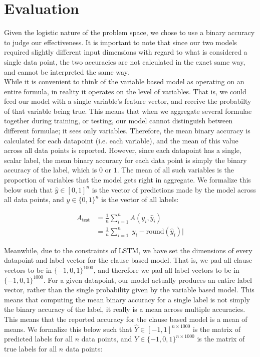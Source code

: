\documentclass{article}
\begin{document}
\section*{Evaluation}
Given the logistic nature of the problem space, we chose to use a binary accuracy to judge our effectiveness. It is
important to note that since our two models required slightly different input dimensions with regard to what is considered
a single data point, the two accuracies are not calculated in the exact same way, and cannot be interpreted the same way.\\

\noindent
While it is convenient to think of the variable based model as operating on an entire formula, in reality it operates on
the level of variables. That is, we could feed our model with a single variable's feature vector, and receive the
probabilty of that variable being true. This means that when we aggregate several formulae together during training,
or testing, our model cannot distinguish between different formulae; it sees only variables. Therefore, the mean binary
accuracy is calculated for each datapoint (i.e. each variable), and the mean of this value across all data points is
reported. However, since each datapoint has a single, scalar label, the mean binary accuracy for each data point is
simply the binary accuracy of the label, which is $0$ or $1$. The mean of all such variables is the proportion of
variables that the model gets right in aggregate. We formalize this below such that $\hat y \in [0, 1]^n$ is the vector of
predictions made by the model across all data points, and $y \in \{0, 1\}^n$ is the vector of all labels:

\[
    \begin{split}
        A_\text{test} &= \frac{1}{n} \sum_{i = 1}^n A(y_i, \hat y_i) \\
        &=  \frac{1}{n} \sum_{i = 1}^n \lvert y_i - \text{round}(\hat y_i)\rvert
    \end{split}
\]

\noindent
Meanwhile, due to the constraints of LSTM, we have set the dimensions of every datapoint and label vector for
the clause based model. That is, we pad all clause vectors to be in $\{-1, 0, 1\}^{1000}$, and therefore we pad all
label vectors to be in $\{-1, 0, 1\}^{1000}$. For a given datapoint, our model actually produces an entire label vector,
rather than the single probability given by the variable based model. This means that computing the mean binary accuracy
for a single label is not simply the binary accuracy of the label, it really is a mean across multiple accuracies.
This means that the reported accuracy for the clause based model is a mean of means. We formalize this below such that
$\hat Y \in [-1, 1]^{n \times 1000}$ is the matrix of predicted labels for all $n$ data points, and
$Y \in \{-1, 0, 1\}^{n \times 1000}$ is the matrix of true labels for all $n$ data points:
\end{document}
